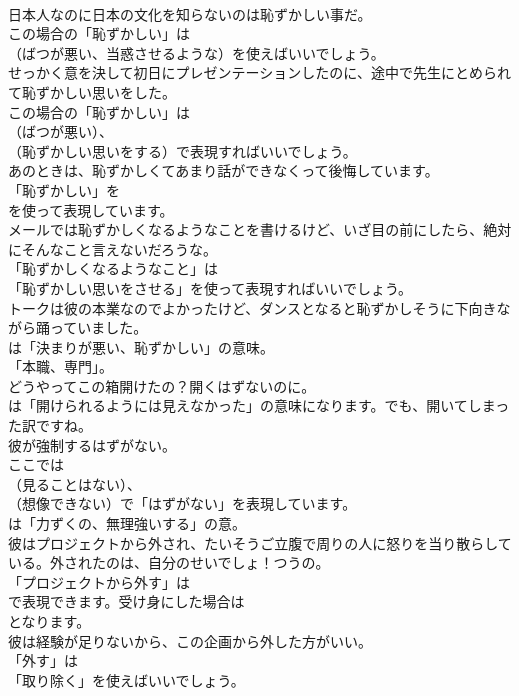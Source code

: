 \documentclass[8pt]{extreport}
\begin{document}
\begin{CJK}{UTF8}{min}
\\	日本人なのに日本の文化を知らないのは恥ずかしい事だ。 
\\	この場合の「恥ずかしい」は
\\	（ばつが悪い、当惑させるような）を使えばいいでしょう。	
\\	せっかく意を決して初日にプレゼンテーションしたのに、途中で先生にとめられて恥ずかしい思いをした。 
\\	この場合の「恥ずかしい」は 
\\	（ばつが悪い）、
\\	（恥ずかしい思いをする）で表現すればいいでしょう。	
\\	あのときは、恥ずかしくてあまり話ができなくって後悔しています。 
\\	「恥ずかしい」を 
\\	を使って表現しています。	
\\	メールでは恥ずかしくなるようなことを書けるけど、いざ目の前にしたら、絶対にそんなこと言えないだろうな。 
\\	「恥ずかしくなるようなこと」は
\\	「恥ずかしい思いをさせる」を使って表現すればいいでしょう。	
\\	トークは彼の本業なのでよかったけど、ダンスとなると恥ずかしそうに下向きながら踊っていました。 
\\	は「決まりが悪い、恥ずかしい」の意味。
\\	「本職、専門」。	
\\	どうやってこの箱開けたの？開くはずないのに。 
\\	は「開けられるようには見えなかった」の意味になります。でも、開いてしまった訳ですね。	
\\	彼が強制するはずがない。 
\\	ここでは 
\\	（見ることはない）、
\\	（想像できない）で「はずがない」を表現しています。
\\	は「力ずくの、無理強いする」の意。	
\\	彼はプロジェクトから外され、たいそうご立腹で周りの人に怒りを当り散らしている。外されたのは、自分のせいでしょ！つうの。 
\\	「プロジェクトから外す」は 
\\	で表現できます。受け身にした場合は 
\\	となります。	
\\	彼は経験が足りないから、この企画から外した方がいい。 
\\	「外す」は
\\	「取り除く」を使えばいいでしょう。	

\end{CJK}
\end{document}

